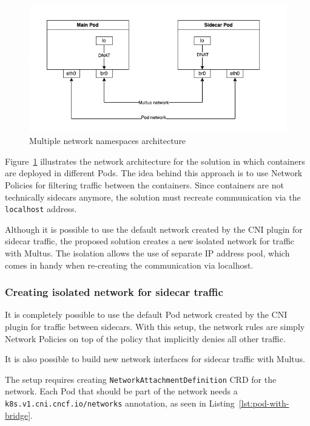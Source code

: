 \documentclass[english, 12pt, a4paper, sci, utf8, a-2b, online]{aaltothesis}
\begin{document}
\begin{figure}[h!]
  \centering
  \includegraphics[width=\linewidth]{files/multus.png}
  \caption{Multiple network namespaces architecture}
  \label{fig:multi-pod-net-solution}
\end{figure}
Figure~\ref{fig:multi-pod-net-solution} illustrates the network architecture for the solution in which containers are deployed in different Pods.
The idea behind this approach is to use Network Policies for filtering traffic between the containers.
Since containers are not technically sidecars anymore, the solution must recreate communication via the \texttt{localhost} address.

Although it is possible to use the default network created by the CNI plugin for sidecar traffic, the proposed solution creates a new isolated network for traffic with Multus.
The isolation allows the use of separate IP address pool, which comes in handy when re-creating the communication via localhost.

\subsubsection{Creating isolated network for sidecar traffic}

It is completely possible to use the default Pod network created by the CNI plugin for traffic between sidecars.
With this setup, the network rules are simply Network Policies on top of the policy that implicitly denies all other traffic.

It is also possible to build new network interfaces for sidecar traffic with Multus.



The setup requires creating \texttt{NetworkAttachmentDefinition} CRD for the network.
Each Pod that should be part of the network needs a \texttt{k8s.v1.cni.cncf.io/networks} annotation, as seen in Listing~\ref{lst:pod-with-bridge}.
\end{document}
